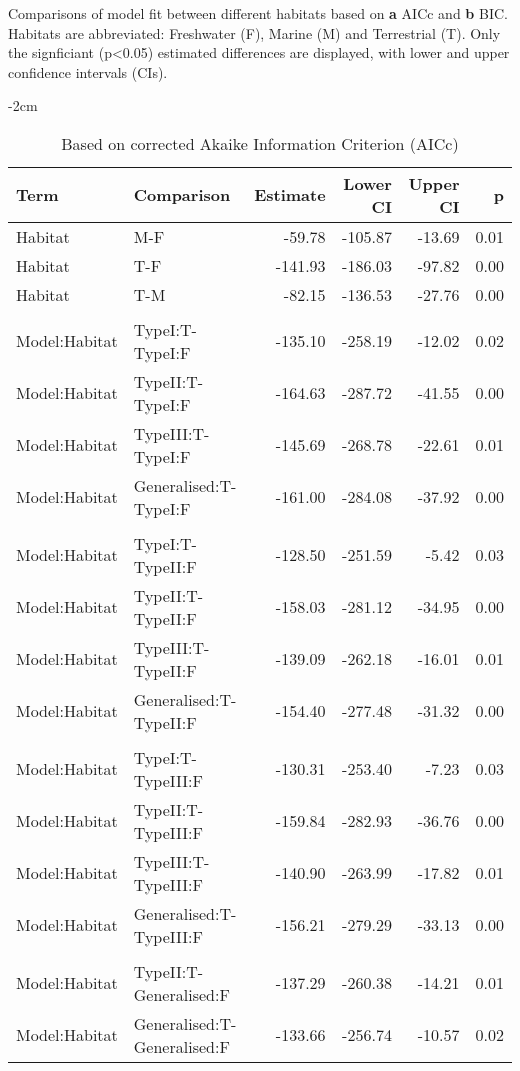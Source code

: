 \documentclass[11pt]{article}
\begin{document}
            
\begin{table}[htpb]
    \caption{Comparisons of model fit between different habitats based on \textbf{a} AICc and \textbf{b} BIC. Habitats are abbreviated: Freshwater (F), Marine (M) and Terrestrial (T). Only the signficiant (p\textless0.05) estimated differences are displayed, with lower and upper confidence intervals (CIs).}
    
    \begin{subtable}{1\textwidth}
    \centering
    \addtolength{\leftskip} {-2cm}
    \addtolength{\rightskip}{-2cm}
        \caption{Based on corrected Akaike Information Criterion (AICc)}\label{tab:sub_first}
\begin{tabular}{llrrrr}
    \toprule
   {\textbf{Term}} & {\textbf{Comparison}} & {\textbf{Estimate}} & {\textbf{Lower CI}} & {\textbf{Upper CI}} & {\textbf{p}} \\ 
    \midrule
    Habitat & M-F & -59.78 & -105.87 & -13.69 & 0.01 \\ 
    Habitat & T-F & -141.93 & -186.03 & -97.82 & 0.00 \\ 
    Habitat & T-M & -82.15 & -136.53 & -27.76 & 0.00 \\
    \\
    Model:Habitat & TypeI:T-TypeI:F & -135.10 & -258.19 & -12.02 & 0.02 \\ 
    Model:Habitat & TypeII:T-TypeI:F & -164.63 & -287.72 & -41.55 & 0.00 \\ 
    Model:Habitat & TypeIII:T-TypeI:F & -145.69 & -268.78 & -22.61 & 0.01 \\ 
    Model:Habitat & Generalised:T-TypeI:F & -161.00 & -284.08 & -37.92 & 0.00 \\
    \\ 
    Model:Habitat & TypeI:T-TypeII:F & -128.50 & -251.59 & -5.42 & 0.03 \\ 
    Model:Habitat & TypeII:T-TypeII:F & -158.03 & -281.12 & -34.95 & 0.00 \\ 
    Model:Habitat & TypeIII:T-TypeII:F & -139.09 & -262.18 & -16.01 & 0.01 \\ 
    Model:Habitat & Generalised:T-TypeII:F & -154.40 & -277.48 & -31.32 & 0.00 \\ 
    \\
    Model:Habitat & TypeI:T-TypeIII:F & -130.31 & -253.40 & -7.23 & 0.03 \\ 
    Model:Habitat & TypeII:T-TypeIII:F & -159.84 & -282.93 & -36.76 & 0.00 \\ 
    Model:Habitat & TypeIII:T-TypeIII:F & -140.90 & -263.99 & -17.82 & 0.01 \\ 
    Model:Habitat & Generalised:T-TypeIII:F & -156.21 & -279.29 & -33.13 & 0.00 \\
    \\
    Model:Habitat & TypeII:T-Generalised:F & -137.29 & -260.38 & -14.21 & 0.01 \\
    Model:Habitat & Generalised:T-Generalised:F & -133.66 & -256.74 & -10.57 & 0.02 \\ 
     \bottomrule
  \end{tabular}
\end{subtable}


\end{table}
\end{document}
